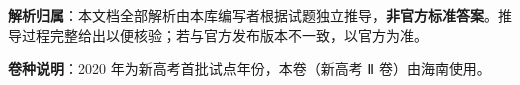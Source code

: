 

\begin{gknotice}
\textbf{解析归属}：本文档全部解析由本库编写者根据试题独立推导，\textbf{非官方标准答案}。推导过程完整给出以便核验；若与官方发布版本不一致，以官方为准。

\textbf{卷种说明}：2020 年为新高考首批试点年份，本卷（新高考 Ⅱ 卷）由海南使用。
\end{gknotice}

\par\medskip


